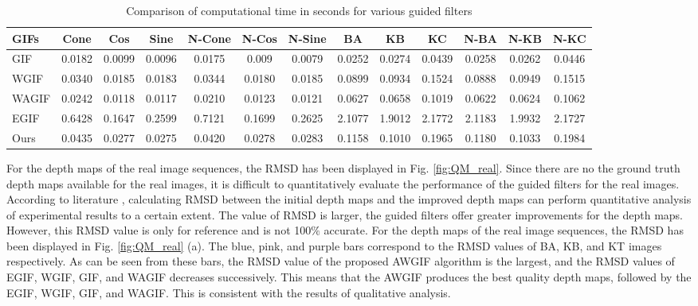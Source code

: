 \documentclass[a4paper,fleqn]{cas-dc}
\begin{document}
\begin{table*}[]
	\centering
\caption{Comparison of computational time in seconds for various guided filters}
\label{ComputationalTime}
	\begin{tabular}{p{.8cm}<{\raggedleft}|ccc|ccc|ccc|ccc}
		\hline
		GIFs & Cone  & Cos  & Sine   & N-Cone  & N-Cos  & N-Sine & BA  & KB  & KC  & N-BA  & N-KB  & N-KC  \\ \hline
		GIF & 0.0182  & 0.0099  & 0.0096  & 0.0175  & 0.009 & 0.0079  & 0.0252  & 0.0274  & 0.0439  & 0.0258  & 0.0262 & 0.0446 \\
		WGIF & 0.0340  & 0.0185  & 0.0183  & 0.0344  & 0.0180 & 0.0185 & 0.0899  & 0.0934  & 0.1524  & 0.0888  & 0.0949 & 0.1515 \\
		WAGIF & 0.0242  & 0.0118  & 0.0117  & 0.0210  & 0.0123 & 0.0121 & 0.0627  & 0.0658  & 0.1019  & 0.0622  & 0.0624 & 0.1062 \\
		EGIF & 0.6428  & 0.1647  & 0.2599  & 0.7121  & 0.1699 & 0.2625 & 2.1077  & 1.9012  & 2.1772  & 2.1183  & 1.9932  & 2.1727  \\
		Ours & 0.0435  & 0.0277  & 0.0275  & 0.0420  & 0.0278 & 0.0283 & 0.1158  & 0.1010  & 0.1965  & 0.1180  & 0.1033 & 0.1984 \\ \hline
	\end{tabular}
	\vspace*{-0.4cm}
\end{table*}

For the depth maps of the real image sequences, the RMSD has been displayed in Fig. \ref{fig:QM_real}. Since there are no the ground truth depth maps available for the real images, it is difficult to quantitatively evaluate the performance of the guided filters for the real images. According to literature \cite{ali2021guided}, calculating RMSD between the initial depth maps and the improved depth maps can perform quantitative analysis of experimental results to a certain extent. The value of RMSD is larger, the guided filters offer greater improvements for the depth maps. However, this RMSD value is only for reference and is not 100$\%$ accurate. For the depth maps of the real image sequences, the RMSD has been displayed in Fig. \ref{fig:QM_real} (a). The blue, pink, and purple bars correspond to the RMSD values of BA, KB, and KT images respectively. As can be seen from these bars, the RMSD value of the proposed AWGIF algorithm is the largest, and the RMSD values of EGIF, WGIF, GIF, and WAGIF decreases successively. This means that the AWGIF produces the best quality depth maps, followed by the EGIF, WGIF, GIF, and WAGIF. This is consistent with the results of qualitative analysis.
\end{document}
